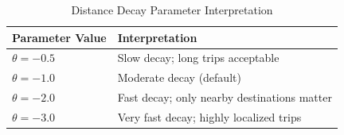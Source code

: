 \begin{table}[H]
\centering
\caption{Distance Decay Parameter Interpretation}
\label{tab:theta_values}
\begin{tabular}{@{}ll@{}}
\toprule
\textbf{Parameter Value} & \textbf{Interpretation} \\
\midrule
$\theta = -0.5$ & Slow decay; long trips acceptable \\
$\theta = -1.0$ & Moderate decay (default) \\
$\theta = -2.0$ & Fast decay; only nearby destinations matter \\
$\theta = -3.0$ & Very fast decay; highly localized trips \\
\bottomrule
\end{tabular}
\end{table}
